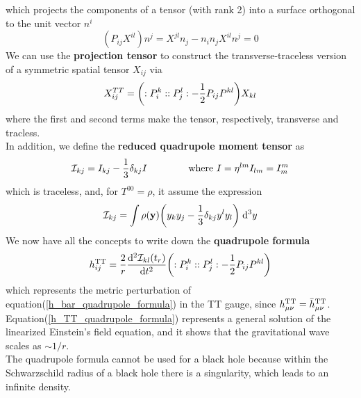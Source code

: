 which projects the components of a tensor (with rank 2) into a surface orthogonal to the unit vector $n^{i}$
\[
(P_{i j} X^{i l}) n^{j} = X^{ j l} n_{j}-  n_{i} n_{j} X^{i l} n^{j} = 0
\]
We can use the \textbf{projection tensor} to construct the transverse-traceless version of a symmetric spatial tensor $X_{ij}$ via
\begin{equation}
\label{TT_projection}
X^{TT} _{ij} = \qty(:P_{i}^{k}::P_{j}^{l}: - \dfrac{1}{2} P_{ij} P^{kl}) X_{kl}
\end{equation}
where the first and second terms make the tensor, respectively, transverse and tracless.\\
In addition, we define the \textbf{reduced quadrupole moment tensor} as
\begin{equation}
\label{reduced_quadrupole_moment_tensor}
\mathcal{I}_{kj} = I_{kj} - \dfrac{1}{3} \delta_{kj} I \hspace{1.5cm} \text{where } I=\eta^{ l m} I_{l m} = I^{m} _{m}
\end{equation}
which is traceless, and, for $T^{00} = \rho$, it assume the expression
\[
\mathcal{I} _{kj} = \int \rho(\vb{y}) \qty(y_{k} y_{j} - \dfrac{1}{3}\delta_{kj} y^{l} y_{l} ) \; \dd[3] y
\]
We now have all the concepts to write down 
the \textbf{quadrupole formula}
\begin{equation}
\label{h_TT_quadrupole_formula}
h^{\text{TT}}_{ij} = \dfrac{2}{r} \dv[2]{\mathcal{I}_{kl}(t_r)}{t} \qty(:P_{i}^{k}::P_{j}^{l}: - \dfrac{1}{2} P_{ij} P^{kl})
\end{equation}
which represents the metric perturbation of equation(\ref{h_bar_quadrupole_formula}) in the TT gauge, since $h^{\text{TT}}_{\mu \nu} = \bar{h} ^{\text{TT}}_{\mu \nu}$.\\
Equation(\ref{h_TT_quadrupole_formula}) represents a general solution of the linearized Einstein's field equation, and it shows that the gravitational wave scales as $\sim 1/r$.
\\
The quadrupole formula cannot be used for a black hole because within the Schwarzschild radius of a black hole there is a singularity, which leads to an infinite density.


